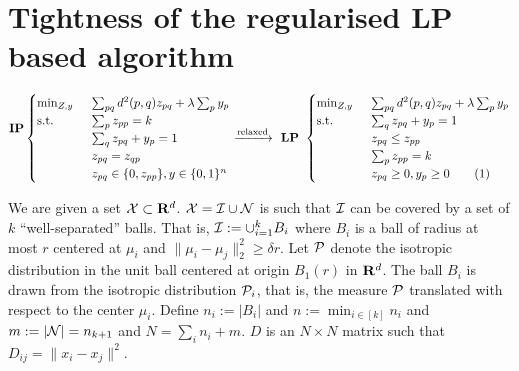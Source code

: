 \section{Tightness of the regularised LP based algorithm}
\begin{equation*}
  \begin{split}
	\textbf{IP}\\
	\textbf{}
  \end{split}
  \begin{cases}
		\min_{Z, y} \enspace &\sum_{pq}d^2(p, q)z_{pq} + \lambda \sum_p y_p\\
		\text{s.t. } \enspace &\sum_{p}z_{pp}= k\\
		& \sum_{q}z_{pq} + y_p = 1\\	
		&z_{pq} = z_{qp} \\
		& z_{pq} \in \{0, z_{pp}\}, y \in \{0, 1\}^n
	\end{cases}
	\xrightarrow{\text{relaxed}} \textbf{ LP } 
	\begin{cases}
		\min_{Z, y} \enspace &\sum_{pq}d^2(p, q)z_{pq} + \lambda \sum_p y_p\\
        \text{s.t. } &\sum_{q}z_{pq} + y_p = 1\\
		& z_{pq} \le z_{pp}\\
		& \sum_{p} z_{pp} = k\\		
		& z_{pq} \ge 0, y_p \ge 0 \numberthis\label{a-eqn:regularisedLP}
	\end{cases}
\end{equation*}

We are given a set $\mathcal X \subset \mathbf R^d$. $\mathcal X = \mathcal I \cup \mathcal N$ is such that $\mathcal I$ can be covered by a set of $k$ ``well-separated'' balls. That is, $\mathcal I := \cup_{i=1}^k B_i$ where $B_i$ is a ball of radius at most $r$ centered at $\mu_i$ and $\|\mu_i - \mu_j\|_{2}^{2} \ge \delta r$. Let $\mathcal P$ denote the isotropic distribution in the unit ball centered at origin $B_1(r)$ in $\mathbf R^d$. The ball $B_i$ is drawn from the isotropic distribution $\mathcal P_i$, that is, the measure $\mathcal P$ translated with respect to the center $\mu_i$. Define $n_i := |B_i|$ and $n := \min_{i\in[k]} n_i$ and $m := |\mathcal N| = n_{k+1}$ and $N = \sum_i n_i + m$. $D$ is an $N\times N$ matrix such that $D_{ij} = \|x_i -x_j\|^2$.

